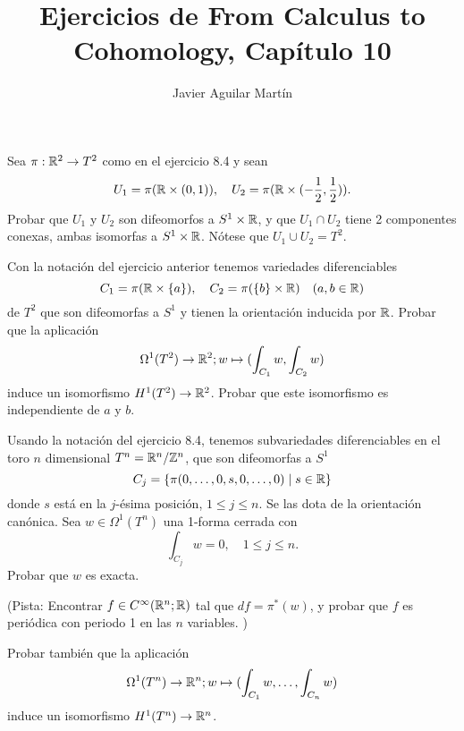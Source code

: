 \documentclass[twoside]{article}
\begin{document}
\title{Ejercicios de From Calculus to Cohomology, Capítulo 10}
\author{Javier Aguilar Martín}
\maketitle

\begin{ejercicio}{10.1}
Sea $\pi:\mathbb{R}^2\to T^2$ como en el ejercicio 8.4 y sean
\[
U_1=\pi(\mathbb{R}\times (0,1)),\quad U_2=\pi(\mathbb{R}\times (-\frac{1}{2},\frac{1}{2})).
\]
Probar que $U_1$ y $U_2$ son difeomorfos a $S^1\times\mathbb{R}$, y que $U_1\cap U_2$ tiene 2 componentes conexas, ambas isomorfas a $S^1\times\mathbb{R}$. Nótese que $U_1\cup U_2=T^2$.
\end{ejercicio}
\begin{solucion}



\end{solucion}
\newpage


\begin{ejercicio}{10.2}
Con la notación del ejercicio anterior tenemos variedades diferenciables
\[
C_1=\pi(\mathbb{R}\times\{a\}),\quad C_2=\pi(\{b\}\times\mathbb{R})\quad (a,b\in\mathbb{R})
\]
de $T^2$ que son difeomorfas a $S^1$ y tienen la orientación inducida por $\mathbb{R}$. Probar que la aplicación
\[
\Omega^1(T^2)\to\mathbb{R}^2; w\mapsto (\int_{C_1}w, \int_{C_2}w)
\]
induce un isomorfismo $H^1(T^2)\to \mathbb{R}^2$. Probar que este isomorfismo es independiente de $a$ y $b$.
\end{ejercicio}
\begin{solucion}

\end{solucion}
\newpage

\begin{ejercicio}{10.3}
Usando la notación del ejercicio 8.4, tenemos subvariedades diferenciables en el toro $n$ dimensional $T^n=\mathbb{R}^n/\mathbb{Z}^n$, que son difeomorfas a $S^1$
\[
C_j=\{\pi(0,\dots, 0,s,0,\dots, 0)\mid s\in\mathbb{R}\}
\]
donde $s$ está en la $j$-ésima posición, $1\leq j\leq n$. Se las dota de la orientación canónica. Sea $w\in\Omega^1(T^n)$ una 1-forma cerrada con 
\[
\int_{C_j}w=0,\quad 1\leq j\leq n.
\]
Probar que $w$ es exacta. 

(Pista: Encontrar $f\in C^{\infty}(\mathbb{R}^n;\mathbb{R})$ tal que $df=\pi^*(w)$, y probar que $f$ es periódica con periodo 1 en las $n$ variables. )

Probar también que la aplicación
\[
\Omega^1(T^n)\to\mathbb{R}^n; w\mapsto (\int_{C_1}w,\dots, \int_{C_n}w)
\]
induce un isomorfismo $H^1(T^n)\to\mathbb{R}^n$. 
\end{ejercicio}
\begin{solucion}

\end{solucion}
\newpage
\end{document}
